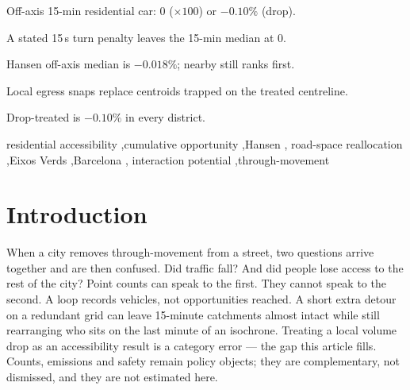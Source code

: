 \documentclass[a4paper,fleqn]{cas-dc}
\begin{document}
\begin{highlights}
\item Off-axis 15-min residential car: $0$ ($\times 100$) or $-0.10\%$ (drop).
\item A stated 15\,s turn penalty leaves the 15-min median at $0$.
\item Hansen off-axis median is $-0.018\%$; nearby still ranks first.
\item Local egress snaps replace centroids trapped on the treated centreline.
\item Drop-treated is $-0.10\%$ in every district.
\end{highlights}

\begin{keywords}
residential accessibility \sep cumulative opportunity \sep Hansen \sep
road-space reallocation \sep Eixos Verds \sep Barcelona \sep
interaction potential \sep through-movement
\end{keywords}

\maketitle
\raggedbottom

\section{Introduction}

When a city removes through-movement from a street, two questions arrive
together and are then confused. Did traffic fall? And did people lose access
to the rest of the city? Point counts can speak to the first. They cannot
speak to the second. A loop records vehicles, not opportunities reached. A
short extra detour on a redundant grid can leave 15-minute catchments almost
intact while still rearranging who sits on the last minute of an isochrone.
Treating a local volume drop as an accessibility result is a category error
--- the gap this article fills. Counts, emissions and safety remain
policy objects; they are complementary, not dismissed, and they are not
estimated here.
\end{document}
